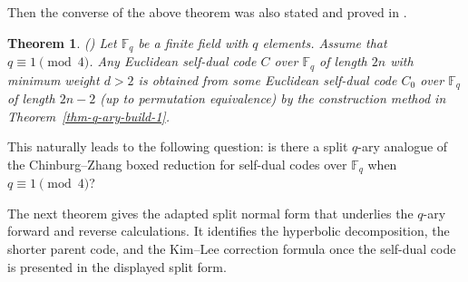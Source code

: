 \documentclass[12pt]{article}
\newtheorem{theorem}{Theorem}[section]
\begin{document}
 Then the converse of the above theorem was also stated and proved in \cite{KimLee}.

\begin{theorem}(\cite[Proposition 2.2]{KimLee}) \label{thm-q-ary-build-2}
Let $\mathbb F_q$ be a finite field with $q$ elements. Assume that $q \equiv 1 \pmod{4}$. Any Euclidean self-dual code $C$ over $\mathbb F_q$ of length $2n$ with minimum weight $d >2$ is obtained from some Euclidean self-dual code $C_0$ over $\mathbb F_q$ of length $2n-2$ (up to permutation equivalence) by the construction method in Theorem~\ref{thm-q-ary-build-1}.
\end{theorem}

This naturally leads to the following question: is there a split \(q\)-ary analogue of the Chinburg--Zhang boxed reduction for self-dual codes over \(\mathbb F_q\) when \(q\equiv 1 \pmod 4\)?

The next theorem gives the adapted split normal form that underlies the \(q\)-ary forward and reverse calculations. It identifies the hyperbolic decomposition, the shorter parent code, and the Kim--Lee correction formula once the self-dual code is presented in the displayed split form.
\end{document}
